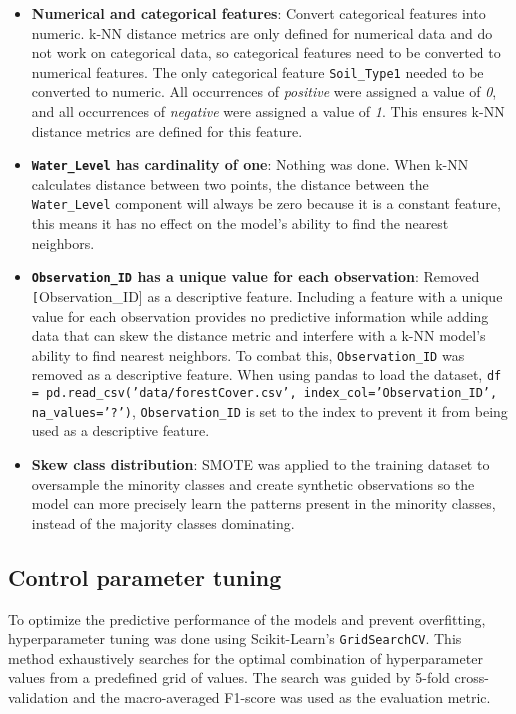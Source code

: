 \documentclass[conference]{IEEEtran}
\begin{document}
\begin{itemize}
    \item \textbf{Numerical and categorical features}: Convert categorical features into numeric. k-NN distance metrics are only defined for numerical data and do not work on categorical data, so categorical features need to be converted to numerical features. The only categorical feature \texttt{Soil\_Type1} needed to be converted to numeric. All occurrences of \textit{positive} were assigned a value of \textit{0}, and all occurrences of \textit{negative} were assigned a value of \textit{1}. This ensures k-NN distance metrics are defined for this feature.
    \item \textbf{\texttt{Water\_Level} has cardinality of one}: Nothing was done. When k-NN calculates distance between two points, the distance between the \texttt{Water\_Level} component will always be zero because it is a constant feature, this means it has no effect on the model's ability to find the nearest neighbors.
    \item \textbf{\texttt{Observation\_ID} has a unique value for each observation}: Removed \texttt[Observation\_ID] as a descriptive feature. Including a feature with a unique value for each observation provides no predictive information while adding data that can skew the distance metric and interfere with a k-NN model's ability to find nearest neighbors. To combat this, \texttt{Observation\_ID} was removed as a descriptive feature. When using pandas to load the dataset, \texttt{df = pd.read\_csv('data/forestCover.csv', index\_col='Observation\_ID', na\_values='?')}, \texttt{Observation\_ID} is set to the index to prevent it from being used as a descriptive feature.
    \item \textbf{Skew class distribution}: SMOTE was applied to the training dataset to oversample the minority classes and create synthetic observations so the model can more precisely learn the patterns present in the minority classes, instead of the majority classes dominating. 
\end{itemize}

\subsection{\textbf{Control parameter tuning}}

To optimize the predictive performance of the models and prevent overfitting, hyperparameter tuning was done using Scikit-Learn's \texttt{GridSearchCV}. This method exhaustively searches for the optimal combination of hyperparameter values from a predefined grid of values. The search was guided by 5-fold cross-validation and the macro-averaged F1-score was used as the evaluation metric.
\end{document}
